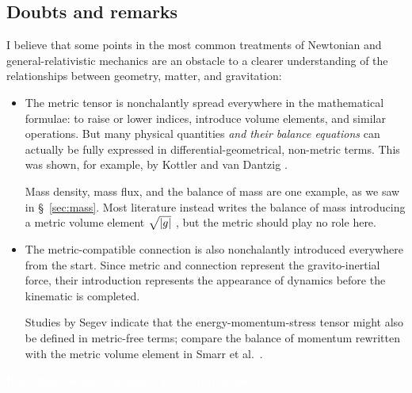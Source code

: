 \documentclass[\ifafour a4paper,12pt,\else a5paper,10pt,\fi%
onecolumn,oneside,article,%
british%
]{memoir}
\theoremstyle{remark}
\theoremstyle{innote}
\newcommand*{\citep}{\parencites}
\newcommand*{\citey}{\parencites*}
\newcommand*{\di}{\mathrm{d}}%
\DeclarePairedDelimiter\abs{\lvert}{\rvert}
\renewcommand*{\|}{\nonscript\,\vert\nonscript\;\mathopen{}}
\newcommand*{\sect}{\S}%
\newcommand*{\eg}{{e.g.}}
\newcommand*{\cf}{{cf.}}
\newcommand*{\etal}{{et al.}}
\newcommand*{\Li}{\mathrm{L}}
\newcommand*{\yvv}{n}
\newcommand*{\yv}{\bm{\yvv}}
\begin{document}


\subsection{Doubts and remarks}
\label{sec:doubts_remarks}

I believe that some points in the most common treatments of Newtonian and
general-relativistic mechanics are an obstacle to a clearer understanding
of the relationships between geometry, matter, and gravitation:
\begin{itemize}[para]
\item The metric tensor is nonchalantly spread everywhere in the
  mathematical formulae: to raise or lower indices, introduce volume
  elements, and similar operations. But many physical quantities \emph{and
    their balance equations} can actually be fully expressed in
  differential-geometrical, non-metric terms. This was shown, for example,
  by Kottler \citey{kottler1922,kottler1922b} and van Dantzig
  \citey{vandantzig1934,vandantzig1934b,vandantzig1934c,vandantzig1934d,vandantzig1934e,vandantzig1937,schoutenetal1940,vandantzig1954}.

  Mass density, mass flux, and the balance of mass are one example, as we
  saw in \sect~\ref{sec:mass}. Most literature instead
  \citep[\eg,][p.~171]{smarretal1980} writes the balance of mass introducing
  a metric volume element $\sqrt{\abs{g}}$ \citep[\cf][\sect~V.B.4,
  pp.~317--318]{choquetbruhatetal1977_r1996}, but the metric should play no
  role here.

\item The metric-compatible connection is also nonchalantly introduced
  everywhere from the start. Since metric and connection represent the
  gravito-inertial force, their introduction represents the appearance of
  dynamics before the kinematic is completed.

  Studies by Segev \citey{segev2002} indicate that the
  energy-momentum-stress tensor might also be defined in metric-free terms;
  compare the balance of momentum rewritten with the metric volume element
  in Smarr \etal\ \citey[p.~171]{smarretal1980}.
\end{itemize}

\textcolor{white}{If you find this you can claim a postcard from me.}

\end{document}
